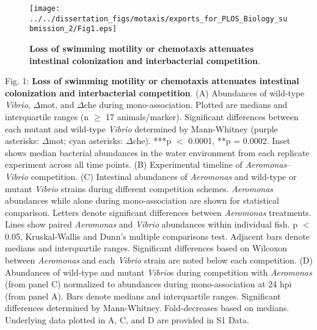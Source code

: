 \begin{figure}[h!]
	\centerline{
		\texttt{[image: ../../dissertation\_figs/motaxis/exports\_for\_PLOS\_Biology\_submission\_2/Fig1.eps]}}
	\caption{\textbf{Loss of swimming motility or chemotaxis attenuates intestinal colonization and interbacterial competition}.}
		
\end{figure}

Fig. 1: \textbf{Loss of swimming motility or chemotaxis attenuates intestinal colonization and interbacterial competition}. (A) Abundances of wild-type \textit{Vibrio}, $\Delta$mot, and $\Delta$che during mono-association. Plotted are medians and interquartile ranges (n $\ge$ 17 animals/marker). Significant differences between each mutant and wild-type \textit{Vibrio} determined by Mann-Whitney (purple asterisks: $\Delta$mot; cyan asterisks: $\Delta$che). ***p $ < $ 0.0001, **p = 0.0002. Inset shows median bacterial abundances in the water environment from each replicate experiment across all time points. (B) Experimental timeline of \textit{Aeromonas}–\textit{Vibrio} competition. (C) Intestinal abundances of \textit{Aeromonas} and wild-type or mutant \textit{Vibrio} strains during different competition schemes. \textit{Aeromonas} abundances while alone during mono-association are shown for statistical comparison. Letters denote significant differences between \textit{Aeromonas} treatments. Lines show paired \textit{Aeromonas} and \textit{Vibrio} abundances within individual fish. p $ < $ 0.05, Kruskal-Wallis and Dunn's multiple comparisons test. Adjacent bars denote medians and interquartile ranges. Significant differences based on Wilcoxon between \textit{Aeromonas} and each \textit{Vibrio} strain are noted below each competition. (D) Abundances of wild-type and mutant \textit{Vibrio}s during competition with \textit{Aeromonas} (from panel C) normalized to abundances during mono-association at 24 hpi (from panel A). Bars denote medians and interquartile ranges. Significant differences determined by Mann-Whitney. Fold-decreases based on medians. Underlying data plotted in A, C, and D are provided in S1 Data.

